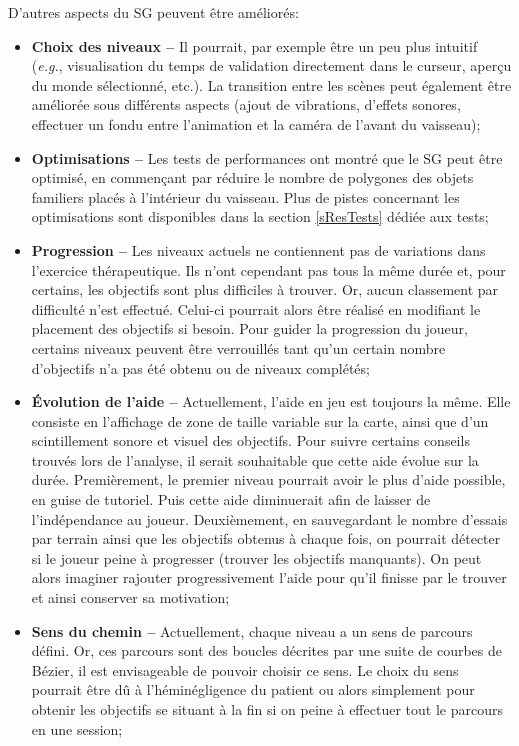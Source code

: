 		D'autres aspects du SG peuvent être améliorés:
		\begin{itemize}
			\item \textbf{Choix des niveaux --} Il pourrait, par exemple être un peu plus intuitif (\textit{e.g.}, visualisation du temps de validation directement dans le curseur, aperçu du monde sélectionné, etc.). La transition entre les scènes peut également être améliorée sous différents aspects (ajout de vibrations, d'effets sonores, effectuer un fondu entre l'animation et la caméra de l'avant du vaisseau);
			
			\item \textbf{Optimisations --} Les tests de performances ont montré que le SG peut être optimisé, en commençant par réduire le nombre de polygones des objets familiers placés à l'intérieur du vaisseau. Plus de pistes concernant les optimisations sont disponibles dans la section \ref{sResTests} dédiée aux tests;
				
			\item \textbf{Progression --} Les niveaux actuels ne contiennent pas de variations dans l'exercice thérapeutique. Ils n'ont cependant pas tous la même durée et, pour certains, les objectifs sont plus difficiles à trouver. Or, aucun classement par difficulté n'est effectué. Celui-ci pourrait alors être réalisé en modifiant le placement des objectifs si besoin. Pour guider la progression du joueur, certains niveaux peuvent être verrouillés tant qu'un certain nombre d'objectifs n'a pas été obtenu ou de niveaux complétés;
			
			\item \textbf{Évolution de l'aide --} Actuellement, l'aide en jeu est toujours la même. Elle consiste en l'affichage de zone de taille variable sur la carte, ainsi que d'un scintillement sonore et visuel des objectifs. Pour suivre certains conseils trouvés lors de l'analyse, il serait souhaitable que cette aide évolue sur la durée. Premièrement, le premier niveau pourrait avoir le plus d'aide possible, en guise de tutoriel. Puis cette aide diminuerait afin de laisser de l'indépendance au joueur. Deuxièmement, en sauvegardant le nombre d'essais par terrain ainsi que les objectifs obtenus à chaque fois, on pourrait détecter si le joueur peine à progresser (trouver les objectifs manquants). On peut alors imaginer rajouter progressivement l'aide pour qu'il finisse par le trouver et ainsi conserver sa motivation;
			
			\item \textbf{Sens du chemin --} Actuellement, chaque niveau a un sens de parcours défini. Or, ces parcours sont des boucles décrites par une suite de courbes de Bézier, il est envisageable de pouvoir choisir ce sens. Le choix du sens pourrait être dû à l'héminégligence du patient ou alors simplement pour obtenir les objectifs se situant à la fin si on peine à effectuer tout le parcours en une session;
			

\end{itemize}
